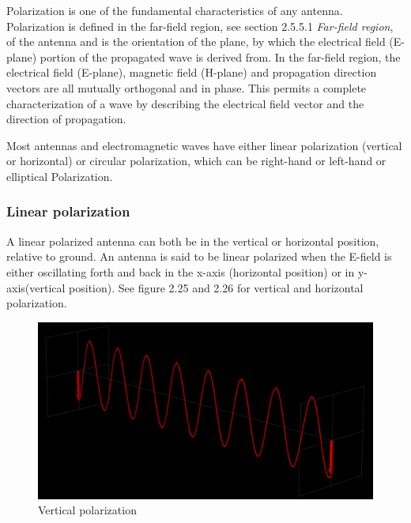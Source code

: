 Polarization is one of the fundamental characteristics of any antenna. Polarization is defined in the far-field region, see section 2.5.5.1 \textit{Far-field region}, of the antenna and is the orientation of the plane, by which the electrical field (E-plane) portion of the propagated wave is derived from. In the far-field region, the electrical field (E-plane), magnetic field (H-plane) and propagation direction vectors are all mutually orthogonal and in phase. This permits a complete characterization of a wave by describing the electrical field vector and the direction of propagation.

Most antennas and electromagnetic waves have either linear polarization (vertical or horizontal) or circular polarization, which can be right-hand or left-hand or elliptical Polarization. 

\subsubsection{Linear polarization}
A linear polarized antenna can both be in the vertical or horizontal position, relative to ground. An antenna is said to be linear polarized when the E-field is either oscillating forth and back in the x-axis (horizontal position) or in y-axis(vertical position). See figure 2.25 and 2.26 for vertical and horizontal polarization. 

\begin{figure}[h]
\centering
\includegraphics[scale=0.25]{figures/VerticalPolarization.PNG}
\caption{Vertical polarization}
\end{figure}

